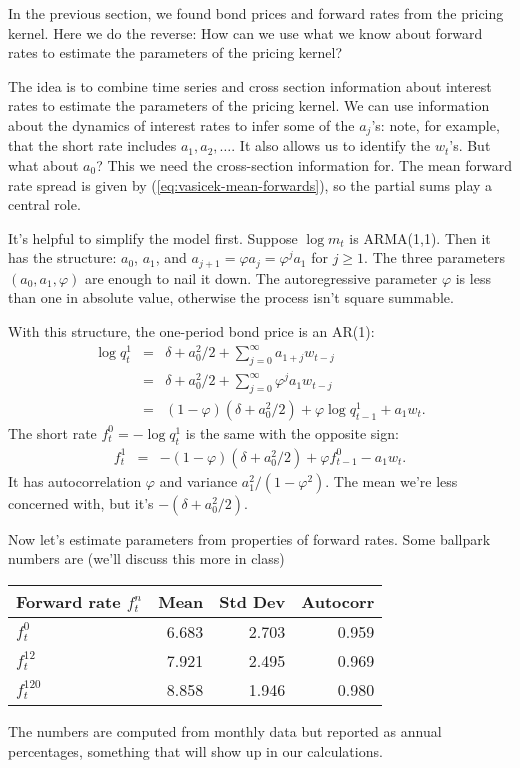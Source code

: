 \documentclass[11pt]{article}
\begin{document}
In the previous section, we found bond prices and forward rates
from the pricing kernel.
Here we do the reverse:  How can we use what we know about forward rates
to estimate the parameters of the pricing kernel?

The idea is to combine time series and cross section information
about interest rates to estimate the parameters of the pricing kernel.
We can use information about the dynamics of interest rates
to infer some of the $a_j$'s:  note, for example, that the short
rate includes $a_1, a_2, \ldots $.
It also allows us to identify the $w_t$'s.
But what about $a_0$?
This we need the cross-section information for.
The mean forward rate spread is given by
(\ref{eq:vasicek-mean-forwards}),
so the partial sums play a central role.


It's helpful to simplify the model first.
Suppose $\log m_t$ is ARMA(1,1).
Then it has the structure:  $a_0$, $a_1$,
and $a_{j+1} = \varphi a_j = \varphi^j a_1$ for $j\geq 1$.
The three parameters $(a_0,a_1,\varphi)$ are enough to nail it down.
The autoregressive parameter $\varphi$ is less than one in absolute value,
otherwise the process isn't square summable.

With this structure, the one-period bond price is an AR(1):
\begin{eqnarray*}
    \log q^1_t &=& \delta + a_0^2/2 + \sum_{j=0}^\infty a_{1+j} w_{t-j}  \\
             &=& \delta + a_0^2/2 + \sum_{j=0}^\infty \varphi^j a_{1} w_{t-j}  \\
             &=& (1-\varphi) (\delta + a_0^2/2) + \varphi \log q^1_{t-1} + a_1 w_t .
\end{eqnarray*}
The short rate $f^0_t = - \log q^1_t$ is the same with the opposite sign:
\begin{eqnarray*}
     f^1_t  &=& - (1-\varphi) (\delta + a_0^2/2) + \varphi f^0_{t-1} - a_1 w_t .
\end{eqnarray*}
It has autocorrelation $\varphi$ and variance $a_1^2/(1-\varphi^2)$.
The mean we're less concerned with, but it's $ - (\delta + a_0^2/2)$.


Now let's estimate parameters from properties of forward rates.
Some ballpark numbers are (we'll discuss this more in class)
%
\begin{center}
\begin{tabular}{lrrr}
\toprule
Forward rate $f^n_t$    &  Mean  &  Std Dev  &  Autocorr \\
\midrule
$f^0_t$                 &  6.683 & 2.703     &  0.959   \\
$f^{12}_t$              &  7.921 & 2.495     &  0.969   \\
$f^{120}_t$             &  8.858 & 1.946     &  0.980   \\
\bottomrule
\end{tabular}
\end{center}
%
The numbers are  computed from monthly data but reported as annual
percentages, something that will show up in our calculations.
\end{document}
